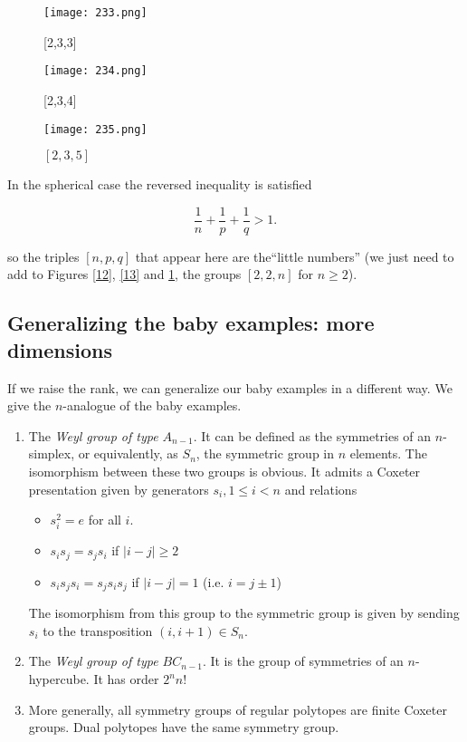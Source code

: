 \documentclass[12pt]{wart}
\theoremstyle{remark}
\begin{document}
\begin{figure}[H]
\begin{minipage}[t]{0.30\linewidth}
    \texttt{[image: 233.png]}
    \caption{[2,3,3]}
    \label{12}
\end{minipage}
    \hfill
\begin{minipage}[t]{0.30\linewidth}
    \texttt{[image: 234.png]}
    \caption{ [2,3,4]}
    \label{13}
\end{minipage} 
   \hfill
\begin{minipage}[t]{0.30\linewidth}
    \texttt{[image: 235.png]}
    \caption{$[2,3,5]$}
    \label{14}
\end{minipage} 
\end{figure}

In the spherical case  the reversed inequality is satisfied

 \begin{equation}\frac{1}{n}+ \frac{1}{p}+\frac{1}{q}>1.\end{equation}

so the triples $[n,p,q]$ that appear here are the``little numbers'' (we just need to add to Figures \ref{12}, \ref{13} and \ref{14}, the groups $[2,2,n]$ for $n\geq 2$).

 \subsection{Generalizing the baby examples: more dimensions}




If we raise the rank, we can generalize our baby examples in a different way. We give the $n$-analogue of the baby examples.

\begin{enumerate}
\item The \emph{Weyl group of type $A_{n-1}$}. It can be defined as the symmetries  of an $n$-simplex, or equivalently, as $S_n$, the symmetric group in $n$ elements. The isomorphism between these two groups is obvious. It  admits a Coxeter presentation given by generators $s_i, 1\leq i <n$ and relations
\begin{itemize}
\item $s_i^2=e$ for all $i$.  
\item  $s_is_j =s_js_i$ if $ \vert i-j\vert \geq 2$ 
\item $s_is_{j}s_i=s_{j}s_is_{j}$ if $ \vert i-j\vert =1$ (i.e. $i=j\pm 1$)
\end{itemize}
The isomorphism from this group to the symmetric group is given by sending $s_i$ to the transposition $(i, i+1)\in S_n.$ 

\item The \emph{Weyl group of type $BC_{n-1}$}. It is the group of symmetries of an $n$-hypercube. It has order $2^nn!$

\item More generally, all symmetry groups of regular polytopes are finite Coxeter groups. Dual polytopes have the same symmetry group. 
\end{enumerate}
\end{document}
